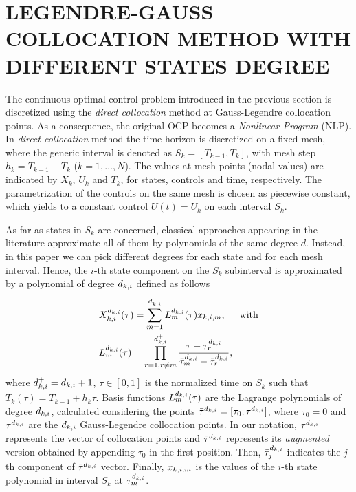 \section*{LEGENDRE-GAUSS COLLOCATION METHOD WITH DIFFERENT STATES DEGREE}
The %
continuous optimal control problem introduced in the previous section is discretized using the \emph{direct collocation} method at Gauss-Legendre collocation points. As a consequence, the original OCP becomes a \emph{Nonlinear Program} (NLP). In \emph{direct collocation} method the time horizon is discretized on a fixed mesh, where the generic interval is denoted as $S_{k} = [T_{k-1}, T_{k}]$, with mesh step $h_{k} = T_{k-1} - T_{k}$ ($k = 1, \ldots, N $). The values at mesh points (nodal values) are indicated by $X_{k}$, $U_{k}$ and $T_{k}$, for  states, controls and time, respectively.
The parametrization of the controls on the same mesh is chosen as piecewise constant, which yields to a constant control $U(t) = U_{k}$ on each interval $S_k$.

As far as states in $S_{k}$ are concerned, classical approaches appearing in the literature approximate all of them by polynomials of the same degree $d$.
Instead, in this paper we can pick different degrees for each state and for each mesh interval. Hence, the $i$-th state component on the $S_{k}$ subinterval is approximated by a polynomial of degree $d_{k,i}$ defined as follows
\begin{subequations}
	\begin{align}
	&X_{k,i}^{d_{k,i}} (\tau) = \sum_{m=1}^{d_{k,i}^{+}} L_{m}^{d_{k,i}}(\tau)x_{k,i,m}, \hspace{5mm} \text{with} \label{Xpoly}\\
	&L_{m}^{d_{k,i}} (\tau) = \prod_{r=1, r\neq m}^{d_{k,i}^{+}} \dfrac{\tau - \bar{\tau}^{d_{k,i}}_{r}}{\bar{\tau}^{d_{k,i}}_{m} - \bar{\tau}^{d_{k,i}}_{r}}, \label{BLagrange}
	\end{align}
\end{subequations}
where $d_{k,i}^{+} = d_{k,i} + 1$, $\tau \in [0,1]$ is the normalized time on $S_k$ such that $T_k(\tau) = T_{k-1} + h_k\tau$.
Basis functions $L_{m}^{d_{k,i}} (\tau)$ are the Lagrange polynomials of degree $d_{k,i}$, calculated considering the points $\bar{\tau}^{d_{k,i}} = [\tau_{0}, \tau^{d_{k,i}}]$, where $\tau_{0} = 0$ and $\tau^{d_{k,i}}$ are the $d_{k,i}$ Gauss-Legendre collocation points. In our notation, $\tau^{d_{k,i}}$  represents the vector of collocation points and $\bar{\tau}^{d_{k,i}}$ represents its \emph{augmented} version obtained by appending $\tau_{0}$ in the first position.
Then, $\bar{\tau}^{d_{k,i}}_{j}$ indicates the $j$-th component of $\bar{\tau}^{d_{k,i}}$ vector.
Finally, $x_{k,i,m}$ is the values of the $i$-th state polynomial in interval $S_k$ at $\bar{\tau}^{d_{k,i}}_{m}$.

